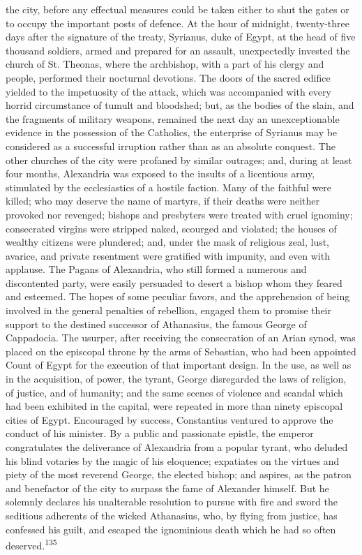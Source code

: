 the city, before any effectual measures could be taken either to
shut the gates or to occupy the important posts of defence. At
the hour of midnight, twenty-three days after the signature of
the treaty, Syrianus, duke of Egypt, at the head of five thousand
soldiers, armed and prepared for an assault, unexpectedly
invested the church of St. Theonas, where the archbishop, with a
part of his clergy and people, performed their nocturnal
devotions. The doors of the sacred edifice yielded to the
impetuosity of the attack, which was accompanied with every
horrid circumstance of tumult and bloodshed; but, as the bodies
of the slain, and the fragments of military weapons, remained the
next day an unexceptionable evidence in the possession of the
Catholics, the enterprise of Syrianus may be considered as a
successful irruption rather than as an absolute conquest. The
other churches of the city were profaned by similar outrages;
and, during at least four months, Alexandria was exposed to the
insults of a licentious army, stimulated by the ecclesiastics of
a hostile faction. Many of the faithful were killed; who may
deserve the name of martyrs, if their deaths were neither
provoked nor revenged; bishops and presbyters were treated with
cruel ignominy; consecrated virgins were stripped naked, scourged
and violated; the houses of wealthy citizens were plundered; and,
under the mask of religious zeal, lust, avarice, and private
resentment were gratified with impunity, and even with applause.
The Pagans of Alexandria, who still formed a numerous and
discontented party, were easily persuaded to desert a bishop whom
they feared and esteemed. The hopes of some peculiar favors, and
the apprehension of being involved in the general penalties of
rebellion, engaged them to promise their support to the destined
successor of Athanasius, the famous George of Cappadocia. The
usurper, after receiving the consecration of an Arian synod, was
placed on the episcopal throne by the arms of Sebastian, who had
been appointed Count of Egypt for the execution of that important
design. In the use, as well as in the acquisition, of power, the
tyrant, George disregarded the laws of religion, of justice, and
of humanity; and the same scenes of violence and scandal which
had been exhibited in the capital, were repeated in more than
ninety episcopal cities of Egypt. Encouraged by success,
Constantius ventured to approve the conduct of his minister. By a
public and passionate epistle, the emperor congratulates the
deliverance of Alexandria from a popular tyrant, who deluded his
blind votaries by the magic of his eloquence; expatiates on the
virtues and piety of the most reverend George, the elected
bishop; and aspires, as the patron and benefactor of the city to
surpass the fame of Alexander himself. But he solemnly declares
his unalterable resolution to pursue with fire and sword the
seditious adherents of the wicked Athanasius, who, by flying from
justice, has confessed his guilt, and escaped the ignominious
death which he had so often deserved.\textsuperscript{135}

